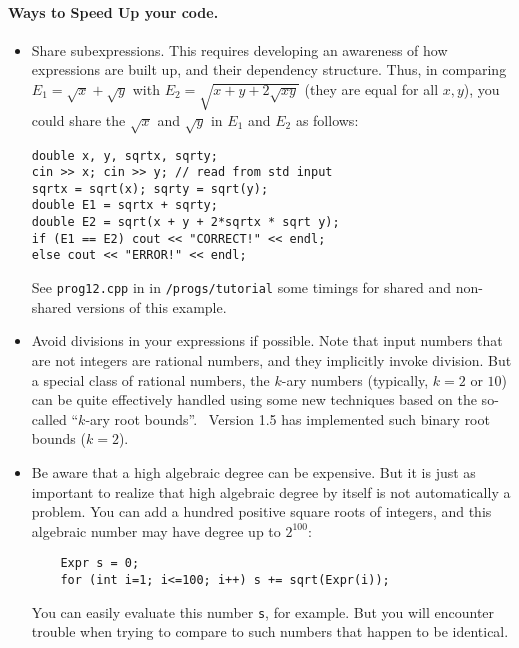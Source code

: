 \documentclass[12pt]{article}
\begin{document}
\paragraph{Ways to Speed Up your code.}

\begin{itemize}
\item
Share subexpressions.
This requires developing an awareness of how expressions are
built up, and their dependency structure.
Thus, in comparing $E_1=\sqrt{x}+\sqrt{y}$ with
$E_2=\sqrt{x + y + 2\sqrt{xy}}$ (they are equal for all $x, y$),
you could share the $\sqrt{x}$ and $\sqrt{y}$ in $E_1$ and $E_2$
as follows:

\begin{progb} {
\> \tt double x, y, sqrtx, sqrty; \\
\> \tt cin >> x;  cin >> y;		// read from std input\\
\> \tt sqrtx = sqrt(x);  sqrty = sqrt(y);\\
\> \tt double E1 = sqrtx + sqrty; \\
\> \tt double E2 = sqrt(x + y + 2*sqrtx * sqrt y); \\
\> \tt if (E1 == E2) cout << "CORRECT!" << endl; \\
\> \tt else cout << "ERROR!" << endl;
}\end{progb}

See \texttt{prog12.cpp} in in \corepath\texttt{/progs/tutorial} some
timings for shared and non-shared versions of this example.

\item
Avoid divisions in your expressions if possible.
Note that input numbers that are not integers 
are rational numbers, and they implicitly invoke
division.  But a special class of rational numbers,
the $k$-ary numbers (typically, $k=2$ or $10$) can be
quite effectively handled using some new techniques
based on the so-called ``$k$-ary root bounds''.
\core\ Version 1.5 has implemented such binary root bounds ($k=2$).
\item
Be aware that a high algebraic degree can be expensive.
But it is just as important to realize that high algebraic
degree by itself is not automatically a problem.
You can add a hundred positive square roots of integers,
and this algebraic number may have degree up to $2^100$:
\begin{verbatim}
	Expr s = 0;
	for (int i=1; i<=100; i++) s += sqrt(Expr(i));
\end{verbatim}
You can easily evaluate this number \texttt{s}, for example.
But you will encounter trouble when trying to 
compare to such numbers that happen to be identical.


\end{itemize}
\end{document}
